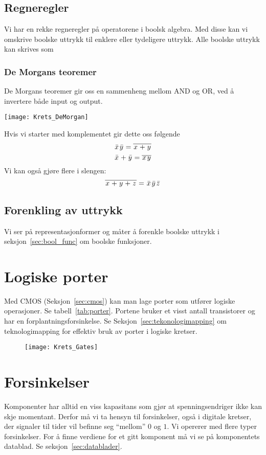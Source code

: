 \documentclass[12pt,a4paper,norsk]{article}
\begin{document}
\subsection{Regneregler}
Vi har en rekke regneregler på operatorene i boolsk algebra. Med disse kan vi
omskrive boolske uttrykk til enklere eller tydeligere uttrykk. Alle boolske
uttrykk kan skrives som 

\subsubsection{De Morgans teoremer}
De Morgans teoremer gir oss en sammenheng mellom AND og OR, ved å invertere både
input og output.

\begin{center}
  \texttt{[image: Krets\_DeMorgan]}
\end{center}

Hvis vi starter med komplementet gir dette oss følgende
\[\kom{x}\kom{y} = \overline{\var{x}+\var{y}}\]
\[\kom{x} + \kom{y} = \overline{\var{x}\var{y}}\]
Vi kan også gjøre flere i slengen:
\[\overline{\var{x} + \var{y} + \var{z}} = \kom{x}\kom{y}\kom{z}\]

\subsection{Forenkling av uttrykk}
Vi ser på representasjonformer og måter å forenkle boolske uttrykk i
seksjon~\ref{sec:bool_func} om boolske funksjoner.

\section{Logiske porter}\label{sec:logiske_porter}
Med CMOS (Seksjon~\ref{sec:cmos}) kan man lage porter som utfører logiske
operasjoner. Se tabell~\ref{tab:porter}. Portene bruker et visst antall
transistorer og har en forplantningsforsinkelse. Se
Seksjon~\ref{sec:tekonologimapping} om teknologimapping for effektiv bruk av
porter i logiske kretser.

\begin{figure}[hbt!]
  \centering
  \texttt{[image: Krets\_Gates]}
\end{figure}

\section{Forsinkelser}\label{sec:forsinkelser}
Komponenter har alltid en viss kapasitans som gjør at spenningsendriger ikke kan
skje momentant. Derfor må vi ta hensyn til forsinkelser, også i digitale
kretser, der signaler til tider vil befinne seg ``mellom'' $0$ og $1$. Vi
opererer med flere typer forsinkelser. For å finne verdiene for et gitt
komponent må vi se på komponentets datablad. Se seksjon~\ref{sec:datablader}.
\end{document}
